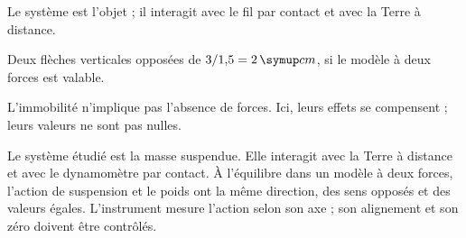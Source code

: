 \par\noindent\begin{minipage}{\linewidth}
\label{cor-defi-10}\begin{questions}
\item Le système est l’objet ; il interagit avec le fil par contact et avec la Terre à distance.
\item Deux flèches verticales opposées de $3/1{,}5=2\unite{cm}$, si le modèle à deux forces est valable.
\item L’immobilité n’implique pas l’absence de forces. Ici, leurs effets se compensent ; leurs valeurs ne sont pas nulles.
\end{questions}
\end{minipage}
\par\noindent\begin{minipage}{\linewidth}
\label{cor-activite-10}
Le système étudié est la masse suspendue. Elle interagit avec la Terre à distance et avec le dynamomètre par contact. À l’équilibre dans un modèle à deux forces, l’action de suspension et le poids ont la même direction, des sens opposés et des valeurs égales. L’instrument mesure l’action selon son axe ; son alignement et son zéro doivent être contrôlés.\par\end{minipage}
